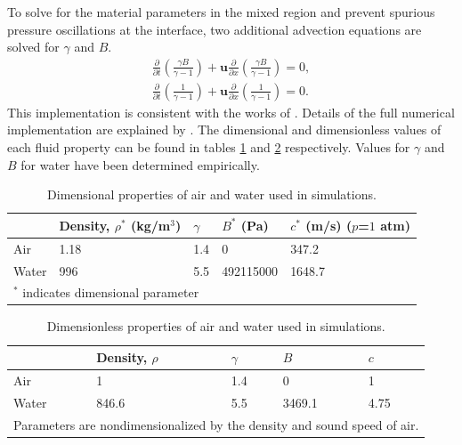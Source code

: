 To solve for the material parameters in the mixed region and prevent
spurious pressure oscillations at the interface, two additional
advection equations are solved for $\gamma$ and $B$.
\begin{subequations} \label{usbe_lung_eosvar_advection}%
  \begin{align}%
    \frac{\partial}{\partial t}\left(\frac{\gamma B}{\gamma-1}\right)+\boldsymbol{u}\frac{\partial}{\partial x}\left(\frac{\gamma B}{\gamma-1}\right) = 0,\\
    \frac{\partial}{\partial t}\left(\frac{1}{\gamma-1}\right)+\boldsymbol{u}\frac{\partial}{\partial x}\left(\frac{1}{\gamma-1}\right) = 0. 
  \end{align}%
\end{subequations}%
This implementation is consistent with the works of \cite{Abgrall1996,
  Shyue2001, Beig2015}. Details of the full numerical implementation
are explained by \cite{HenrydeFrahan2015}.
%
The dimensional and dimensionless values of each fluid property can be
found in tables \ref{tab:usbe_lung_dimensional_parameters} and
\ref{tab:usbe_lung_dimensionless_parameters} respectively. Values for
$\gamma$ and $B$ for water have been determined
empirically\citep{Marsh1980,holian1984t,Cocchi1996}.
% 
\begin{table}[bp]%
  \begin{center}
    \caption{Dimensional properties of air and water used in simulations.}
    \label{tab:usbe_lung_dimensional_parameters}%
    \begin{tabularx}{0.75\textwidth}{| X | X | X | X | X |}
      \hline
      & Density, $\rho^*$ (kg/m$^3$) & $\gamma$ & $B^*$ (Pa)  & $c^*$ (m/s) ($p$=$1$ atm) \\ \hline
      Air   & 1.18                        & 1.4      & 0         & 347.2     \\ \hline
      Water & 996                           & 5.5      & 492115000 & 1648.7     \\ \hline
      \multicolumn{5}{l}{\small $^*$ indicates dimensional parameter}
    \end{tabularx}
  \end{center}
\end{table}%
\begin{table}[bp]%
  \begin{center}
    \caption{Dimensionless properties of air and water used in simulations.}
    \label{tab:usbe_lung_dimensionless_parameters}%
    \begin{tabularx}{0.75\textwidth}{| X | X | X | X | X |}
      \hline
      & Density, $\rho$ & $\gamma$ & $B$ & $c$ \\ \hline
      Air   & 1                          & 1.4      & 0         & 1          \\ \hline
      Water & 846.6                      & 5.5      & 3469.1    & 4.75       \\ \hline
      \multicolumn{5}{l}{\small Parameters are nondimensionalized by the density and sound speed of air. }
    \end{tabularx}
  \end{center}
\end{table}
% 
